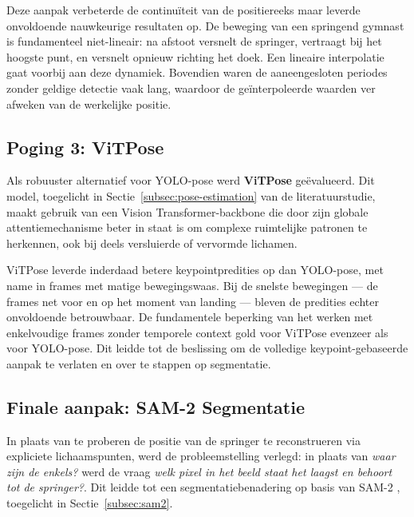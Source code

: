 Deze aanpak verbeterde de continuïteit van de positiereeks maar leverde onvoldoende nauwkeurige resultaten op. De beweging van een springend gymnast is fundamenteel niet-lineair: na afstoot versnelt de springer, vertraagt bij het hoogste punt, en versnelt opnieuw richting het doek. Een lineaire interpolatie gaat voorbij aan deze dynamiek. Bovendien waren de aaneengesloten periodes zonder geldige detectie vaak lang, waardoor de geïnterpoleerde waarden ver afweken van de werkelijke positie.

\subsection{Poging 3: ViTPose}
\label{subsec:landingspositie-vitpose}

Als robuuster alternatief voor YOLO-pose werd \textbf{ViTPose} \autocite{Xu2022} geëvalueerd. Dit model, toegelicht in Sectie~\ref{subsec:pose-estimation} van de literatuurstudie, maakt gebruik van een Vision Transformer-backbone die door zijn globale attentiemechanisme beter in staat is om complexe ruimtelijke patronen te herkennen, ook bij deels versluierde of vervormde lichamen.

ViTPose leverde inderdaad betere keypointpredities op dan YOLO-pose, met name in frames met matige bewegingswaas. Bij de snelste bewegingen — de frames net voor en op het moment van landing — bleven de predities echter onvoldoende betrouwbaar. De fundamentele beperking van het werken met enkelvoudige frames zonder temporele context gold voor ViTPose evenzeer als voor YOLO-pose. Dit leidde tot de beslissing om de volledige keypoint-gebaseerde aanpak te verlaten en over te stappen op segmentatie.

\subsection{Finale aanpak: SAM-2 Segmentatie}
\label{subsec:landingspositie-sam2}

In plaats van te proberen de positie van de springer te reconstrueren via expliciete lichaamspunten, werd de probleemstelling verlegd: in plaats van \textit{waar zijn de enkels?} werd de vraag \textit{welk pixel in het beeld staat het laagst en behoort tot de springer?}. Dit leidde tot een segmentatiebenadering op basis van SAM-2 \autocite{Ravi2024}, toegelicht in Sectie~\ref{subsec:sam2}.

